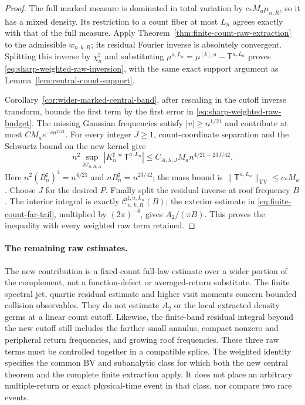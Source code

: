 \begin{proof}
The full marked measure is dominated in total variation by
$c_*M_a\mu_{n,R}$, so it has a mixed density. Its restriction to a
count fiber at most $L_n$ agrees exactly with that of the full
measure. Apply Theorem~\ref{thm:finite-count-raw-extraction} to the
admissible $w_{n,k,R}$; its residual Fourier inverse is absolutely
convergent. Splitting this inverse by $\chi_n^\sharp$ and substituting
$\mu^{a,L_n}=\mu^{[k],a}-\mathsf T^{a,L_n}$ proves
\eqref{eq:sharp-weighted-raw-inversion}, with the same exact support
argument as Lemma~\ref{lem:central-count-support}.

Corollary~\ref{cor:wider-marked-central-band}, after rescaling in
the cutoff inverse transform, bounds the first term by the first
error in \eqref{eq:sharp-weighted-raw-budget}. The missing Gaussian
frequencies satisfy $|v|\ge n^{1/21}$ and contribute at most
$CM_ae^{-c n^{2/21}}$. For every integer $J\ge1$, count-coordinate
separation and the Schwartz bound on the new kernel give
\[
 n^2\sup_{\mathcal W_{n,R,A}}|K_n^\sharp*\mathsf T^{a,L_n}|
          \le C_{A,\lambda,J}M_a n^{4/21-23J/42}.
\]
Here $n^2(B_n^\sharp)^4=n^{4/21}$ and
$nB_n^\sharp=n^{23/42}$; the mass bound is
$\|\mathsf T^{a,L_n}\|_{\mathrm{TV}}\le c_*M_a$.
Choose $J$ for the desired $P$. Finally split the residual inverse
at roof frequency $B$. The interior integral is exactly
$\mathcal C^{\sharp,a,L_n}_{n,k,R}(B)$; the exterior estimate in
\eqref{eq:finite-count-far-tail}, multiplied by $(2\pi)^{-4}$,
gives $A_2/(\pi B)$. This proves the inequality with every weighted
raw term retained.
\end{proof}

\paragraph{The remaining raw estimates.}
The new contribution is a fixed-count full-law estimate over a wider
portion of the complement, not a function-defect or averaged-return
substitute. The finite spectral jet, quartic residual estimate and
higher visit moments concern bounded collision observables. They do
not estimate $A_2$ or the local extracted density germs at a linear
count cutoff. Likewise, the finite-band residual integral beyond the
new cutoff still includes the farther small annulus, compact nonzero
and peripheral return frequencies, and growing roof frequencies.
These three raw terms must be controlled together in a compatible
splice. The weighted identity specifies the common BV and subanalytic
class for which both the new central theorem and the complete finite
extraction apply. It does not place an arbitrary multiple-return or
exact physical-time event in that class, nor compare two rare events.
